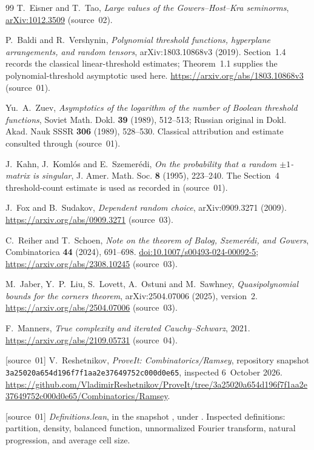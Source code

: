 \documentclass[11pt,letterpaper]{article}
\numberwithin{equation}{section}
\theoremstyle{definition}
\theoremstyle{remark}
\newcommand{\1}{\mathbf 1}
\newcommand{\snapshot}{\texttt{3a25020a654d196f7f1aa2e37649752c000d0e65}}
\begin{document}
\begin{thebibliography}{99}
T.~Eisner and T.~Tao, \emph{Large values of the Gowers--Host--Kra seminorms}, \href{https://arxiv.org/abs/1012.3509}{arXiv:1012.3509} (source~02).

P.~Baldi and R.~Vershynin, \emph{Polynomial threshold functions, hyperplane arrangements, and random tensors}, arXiv:1803.10868v3 (2019). Section~1.4 records the classical linear-threshold estimates; Theorem~1.1 supplies the polynomial-threshold asymptotic used here. \url{https://arxiv.org/abs/1803.10868v3} (source~01).

Yu.~A.~Zuev, \emph{Asymptotics of the logarithm of the number of Boolean threshold functions}, Soviet Math. Dokl. \textbf{39} (1989), 512--513; Russian original in Dokl. Akad. Nauk SSSR \textbf{306} (1989), 528--530. Classical attribution and estimate consulted through \cite{bv} (source~01).

J.~Kahn, J.~Koml\'os and E.~Szemer\'edi, \emph{On the probability that a random $\pm1$-matrix is singular}, J. Amer. Math. Soc. \textbf{8} (1995), 223--240. The Section~4 threshold-count estimate is used as recorded in \cite{bv} (source~01).

J.~Fox and B.~Sudakov, \emph{Dependent random choice}, arXiv:0909.3271 (2009). \url{https://arxiv.org/abs/0909.3271} (source~03).

C.~Reiher and T.~Schoen, \emph{Note on the theorem of Balog, Szemer\'edi, and Gowers}, Combinatorica \textbf{44} (2024), 691--698. \href{https://doi.org/10.1007/s00493-024-00092-5}{doi:10.1007/s00493-024-00092-5}; \url{https://arxiv.org/abs/2308.10245} (source~03).

M.~Jaber, Y.~P.~Liu, S.~Lovett, A.~Ostuni and M.~Sawhney, \emph{Quasipolynomial bounds for the corners theorem}, arXiv:2504.07006 (2025), version~2. \url{https://arxiv.org/abs/2504.07006} (source~03).

F.~Manners, \emph{True complexity and iterated Cauchy--Schwarz}, 2021. \url{https://arxiv.org/abs/2109.05731} (source~04).

[source~01] V.~Reshetnikov, \emph{ProveIt: Combinatorics/Ramsey}, repository snapshot \snapshot, inspected 6~October 2026. \url{https://github.com/VladimirReshetnikov/ProveIt/tree/3a25020a654d196f7f1aa2e37649752c000d0e65/Combinatorics/Ramsey}.

[source~01] \emph{Definitions.lean}, in the snapshot \cite{repo01}, under . Inspected definitions: partition, density, balanced function, unnormalized Fourier transform, natural progression, and average cell size.


\end{thebibliography}
\end{document}
